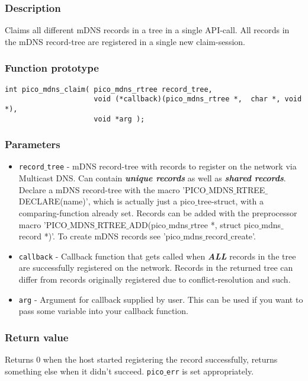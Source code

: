 \subsubsection*{Description}
Claims all different mDNS records in a tree in a single API-call. All records in the mDNS record-tree are registered in a single new claim-session.

\subsubsection*{Function prototype}
\begin{verbatim}
int pico_mdns_claim( pico_mdns_rtree record_tree,
                     void (*callback)(pico_mdns_rtree *,  char *, void *),
                     void *arg );
\end{verbatim}

\subsubsection*{Parameters}
\begin{itemize}[noitemsep]
\item \texttt{record$\_$tree} - mDNS record-tree with records to register on the network via Multicast DNS. Can contain \textbf{\emph{unique records}} as well as \textbf{\emph{shared records}}. Declare a mDNS record-tree with the macro 'PICO$\_$MDNS$\_$RTREE$\_$DECLARE(name)', which is actually just a pico$\_$tree-struct, with a comparing-function already set. Records can be added with the preprocessor macro 'PICO$\_$MDNS$\_$RTREE$\_$ADD(pico$\_$mdns$\_$rtree *, struct pico$\_$mdns$\_$record *)'. To create mDNS records see 'pico$\_$mdns$\_$record$\_$create'.
\item \texttt{callback} - Callback function that gets called when \textbf{\emph{ALL}} records in the tree are successfully registered on the network. Records in the returned tree can differ from records originally registered due to conflict-resolution and such.
\item \texttt{arg} - Argument for callback supplied by user. This can be used if you want to pass some variable into your callback function.
\end{itemize}

\subsubsection*{Return value}
Returns 0 when the host started registering the record successfully, returns something else when it didn't succeed. \texttt{pico$\_$err} is set appropriately.

